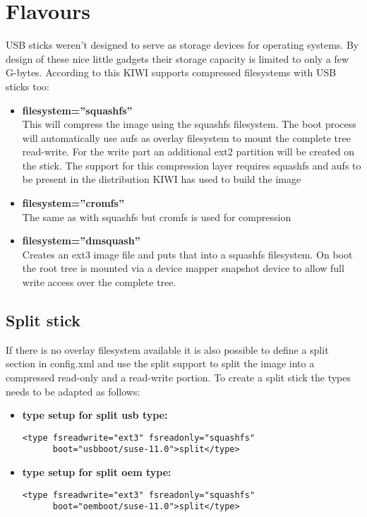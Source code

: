 \section{Flavours}

USB sticks weren't designed to serve as storage devices for
operating systems. By design of these nice little gadgets their
storage capacity is limited to only a few G-bytes. According to
this KIWI supports compressed filesystems with USB sticks too:  

\begin{itemize}
\item \textbf{filesystem=''squashfs''}\\
      This will compress the image using the squashfs filesystem. The
      boot process will automatically use aufs as overlay filesystem to
      mount the complete tree read-write. For the write part an additional
      ext2 partition will be created on the stick. The support for this
      compression layer requires squashfs and aufs to be present in
      the distribution KIWI has used to build the image 
\item \textbf{filesystem=''cromfs''}\\
      The same as with squashfs but cromfs is used for compression
\item \textbf{filesystem=''dmsquash''}\\
      Creates an ext3 image file and puts that
      into a squashfs filesystem. On boot the root tree is mounted
      via a device mapper snapshot device to allow full write
      access over the complete tree.
\end{itemize}

\subsection{Split stick}
If there is no overlay filesystem available it is also possible to
define a split section in config.xml and use the split support to
split the image into a compressed read-only and a read-write portion.
To create a split stick the types needs to be adapted as follows:

\begin{itemize}
\item \textbf{type setup for split usb type:}

      \begin{Command}{12cm}
      \begin{verbatim}
<type fsreadwrite="ext3" fsreadonly="squashfs"
      boot="usbboot/suse-11.0">split</type>
      \end{verbatim}
      \end{Command}
\item \textbf{type setup for split oem type:}

      \begin{Command}{12cm}
      \begin{verbatim}
<type fsreadwrite="ext3" fsreadonly="squashfs"
      boot="oemboot/suse-11.0">split</type>
      \end{verbatim}
      \end{Command}
\end{itemize}

